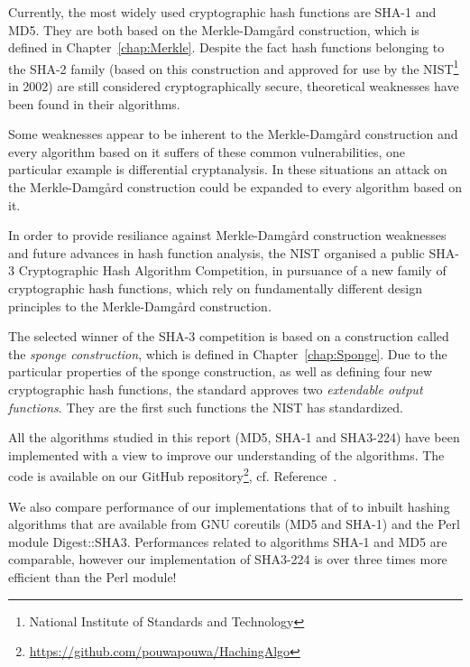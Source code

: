 Currently, the most widely used cryptographic hash functions are \textsc{SHA-1} and \textsc{MD5}. They are both based on the Merkle-Damg\r{a}rd construction, which is defined in Chapter~\ref{chap:Merkle}. Despite the fact hash functions belonging to the \textsc{SHA-2} family (based on this construction and approved for use by the NIST\footnote{National Institute of Standards and Technology} in 2002) are still considered cryptographically secure, theoretical weaknesses have been found in their algorithms.

Some weaknesses appear to be inherent to the Merkle-Damg\r{a}rd construction and every algorithm based on it suffers of these common vulnerabilities, one particular example is differential cryptanalysis. In these situations an attack on the Merkle-Damg\r{a}rd construction could be expanded to every algorithm based on it.

In order to provide resiliance against Merkle-Damg\r{a}rd construction weaknesses and future advances in hash function analysis, the NIST organised a public \textsc{SHA-3} Cryptographic Hash Algorithm Competition, in pursuance of a new family of cryptographic hash functions, which rely on fundamentally different design principles to the Merkle-Damg\r{a}rd construction.

The selected winner of the \textsc{SHA-3} competition is based on a construction called the \emph{sponge construction}, which is defined in Chapter~\ref{chap:Sponge}. Due to the particular properties of the sponge construction, as well as defining four new cryptographic hash functions, the standard approves two \emph{extendable output functions}. They are the first such functions the NIST has standardized.


All the algorithms studied in this report (MD5, SHA-1 and SHA3-224) have been implemented with a view to improve our understanding of the algorithms.
The code is available on our GitHub repository\footnote{\url{https://github.com/pouwapouwa/HachingAlgo}}, cf. Reference~\cite{GitLove}.

We also compare performance of our implementations that of to inbuilt hashing algorithms that are available from GNU coreutils (MD5 and SHA-1) and the Perl module Digest::SHA3. Performances related to algorithms SHA-1 and MD5 are comparable, however our implementation of SHA3-224 is over three times more efficient than the Perl module!  
